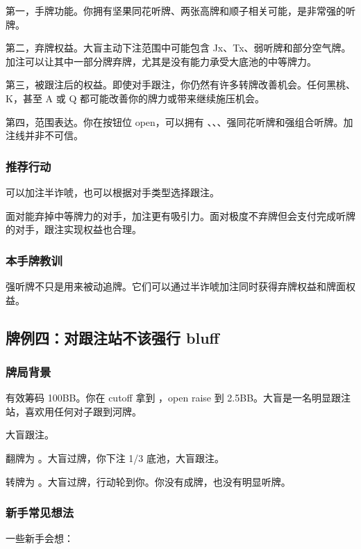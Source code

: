 第一，手牌功能。你拥有坚果同花听牌、两张高牌和顺子相关可能，是非常强的听牌。

第二，弃牌权益。大盲主动下注范围中可能包含 Jx、Tx、弱听牌和部分空气牌。加注可以让其中一部分牌弃牌，尤其是没有能力承受大底池的中等牌力。

第三，被跟注后的权益。即使对手跟注，你仍然有许多转牌改善机会。任何黑桃、K，甚至 A 或 Q 都可能改善你的牌力或带来继续施压机会。

第四，范围表达。你在按钮位 open，可以拥有 、、、强同花听牌和强组合听牌。加注线并非不可信。

\subsubsection*{推荐行动}

可以加注半诈唬，也可以根据对手类型选择跟注。

面对能弃掉中等牌力的对手，加注更有吸引力。面对极度不弃牌但会支付完成听牌的对手，跟注实现权益也合理。

\subsubsection*{本手牌教训}

强听牌不只是用来被动追牌。它们可以通过半诈唬加注同时获得弃牌权益和牌面权益。

\subsection{牌例四：对跟注站不该强行 bluff}

\subsubsection*{牌局背景}

有效筹码 100BB。你在 cutoff 拿到 ，open raise 到 2.5BB。大盲是一名明显跟注站，喜欢用任何对子跟到河牌。

大盲跟注。

翻牌为 。大盲过牌，你下注 1/3 底池，大盲跟注。

转牌为 。大盲过牌，行动轮到你。你没有成牌，也没有明显听牌。

\subsubsection*{新手常见想法}

一些新手会想：

